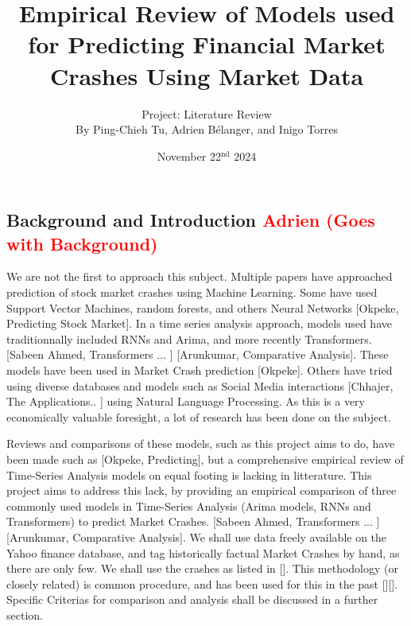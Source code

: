 \documentclass[12pt, letterpaper]{article}
\title{Empirical Review of Models used for Predicting Financial Market Crashes Using Market Data}
\author{\large Project: Literature Review \vspace{0.75em} \\ \normalsize By Ping-Chieh Tu, Adrien Bélanger, and Inigo Torres}
\date{November 22$^{\text{nd}}$ 2024}
\begin{document}
\maketitle 

\justifying %
\begin{comment}
Overall objective to keep in mind:

"In this milestone, the objective is to review the related literature to your proposal. This will better inform your methodology for your project if it involves a new idea, and it is necessary if you are comparing existing methods for a certain domain. It may even lead to a change of proposal, once you learn about existing methods out there. If you are producing a literature survey on a research topic, in this stage, you just provide a "breadth" review, in which you emphasize covering as many related works as possible and providing some preliminary organization without going into much detail."\\

Evaluation Criterias:

- Putting your proposal into context of related literature

- Coverage (are you adequately covering most relevant works)
\end{comment}
\subsection*{Background and Introduction \textcolor{red}{Adrien (Goes with Background)} }
We are not the first to approach this subject. 
Multiple papers have approached prediction of stock market crashes using Machine Learning. 
Some have used Support Vector Machines, random forests, and others Neural Networks [Okpeke, Predicting Stock Market]. 
In a time series analysis approach, models used have traditionnally included RNNs and Arima, and more recently Transformers. [Sabeen Ahmed, Transformers ... ] [Arunkumar, Comparative Analysis]. 
These models have been used in Market Crash prediction [Okpeke]. 
Others have tried using diverse databases and models such as Social Media interactions [Chhajer, The Applications.. ] using Natural Language Processing. As this is a very economically valuable foresight, a lot of research has been done on the subject.


Reviews and comparisons of these models, such as this project aims to do, have been made such as [Okpeke, Predicting], but a comprehensive empirical review of Time-Series Analysis models on equal footing is lacking in litterature. 
This project aims to address this lack, by providing an empirical comparison of three commonly used models in Time-Series Analysis (Arima models, RNNs and Transformers) to predict Market Crashes. [Sabeen Ahmed, Transformers ... ] [Arunkumar, Comparative Analysis]. 
We shall use data freely available on the Yahoo finance database, and tag historically factual Market Crashes by hand, as there are only few. We shall use the crashes as listed in []. This methodology (or closely related) is common procedure, and has been used for this in the past [][]. Specific Criterias for comparison and analysis shall be discussed in a further section.
\end{document}
